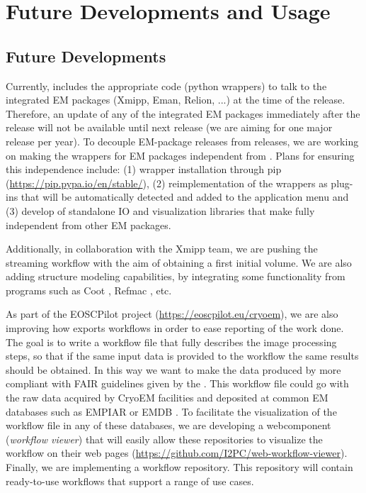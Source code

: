 \section{Future Developments and Usage}

\subsection{Future Developments}
Currently, \scipion includes the appropriate code (python wrappers) to talk to the integrated EM packages (Xmipp, Eman, Relion, ...) at the time of the release. Therefore, an update of any of the integrated EM packages immediately after the \scipion release will not be available until next \scipion release (we are aiming for one major release per year). To decouple EM-package releases from \scipion releases, we are working on making the wrappers for EM packages  independent from \scipion. Plans for ensuring this independence include: (1) wrapper installation through pip (\url{https://pip.pypa.io/en/stable/}), (2) reimplementation of the wrappers as plug-ins that will be automatically detected and added to the application menu and (3) develop of standalone IO  and visualization libraries that make \scipion fully independent from other EM packages.

Additionally, in collaboration with the Xmipp team, we are pushing the streaming workflow with the aim of obtaining a first initial volume. We are also adding structure modeling capabilities, by integrating some functionality from programs such as Coot \citep{emsley2010:coot}, Refmac \citep{Murshudov1997:refmac}, etc. 

As part of the EOSCPilot project (\url{https://eoscpilot.eu/cryoem}), we are also improving  how \scipion exports workflows in order to ease reporting of the work done. The goal is to write a workflow file that fully describes the image processing steps, so that if the same input data is provided to the workflow the same results should be obtained. In this way we want to make  the data produced by \scipion more compliant with FAIR guidelines given by the \citet{eu2016:fair}. This workflow file could go with the raw data acquired by CryoEM facilities and deposited at common EM databases such as EMPIAR or EMDB \citep{Patwardhan2016:databasesEM}. To facilitate the visualization of the workflow file in any of these databases, we are  developing a  webcomponent (\scipion \emph{workflow viewer}) that will easily allow these repositories to visualize the workflow on their web pages (\url{https://github.com/I2PC/web-workflow-viewer}). Finally, we are implementing a workflow repository. This repository will contain ready-to-use workflows that support a range of use cases.

